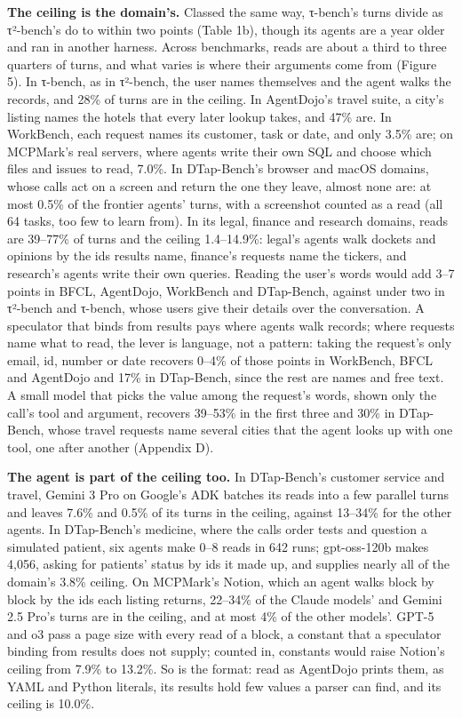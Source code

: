 \documentclass[10pt,twocolumn,letterpaper]{article}
\newcommand{\runin}[1]{{\sffamily\bfseries\color{accent}#1}}
\begin{document}
\runin{The ceiling is the domain's.} Classed the same way, τ-bench's turns divide as τ²-bench's do to within two points (Table 1b), though its agents are a year older and ran in another harness. Across benchmarks, reads are about a third to three quarters of turns, and what varies is where their arguments come from (Figure 5). In τ-bench, as in τ²-bench, the user names themselves and the agent walks the records, and 28\% of turns are in the ceiling. In AgentDojo's travel suite, a city's listing names the hotels that every later lookup takes, and 47\% are. In WorkBench, each request names its customer, task or date, and only 3.5\% are; on MCPMark's real servers, where agents write their own SQL and choose which files and issues to read, 7.0\%. In DTap-Bench's browser and macOS domains, whose calls act on a screen and return the one they leave, almost none are: at most 0.5\% of the frontier agents' turns, with a screenshot counted as a read (all 64 tasks, too few to learn from). In its legal, finance and research domains, reads are 39--77\% of turns and the ceiling 1.4--14.9\%: legal's agents walk dockets and opinions by the ids results name, finance's requests name the tickers, and research's agents write their own queries. Reading the user's words would add 3--7 points in BFCL, AgentDojo, WorkBench and DTap-Bench, against under two in τ²-bench and τ-bench, whose users give their details over the conversation. A speculator that binds from results pays where agents walk records; where requests name what to read, the lever is language, not a pattern: taking the request's only email, id, number or date recovers 0--4\% of those points in WorkBench, BFCL and AgentDojo and 17\% in DTap-Bench, since the rest are names and free text. A small model that picks the value among the request's words, shown only the call's tool and argument, recovers 39--53\% in the first three and 30\% in DTap-Bench, whose travel requests name several cities that the agent looks up with one tool, one after another (Appendix D).

\runin{The agent is part of the ceiling too.} In DTap-Bench's customer service and travel, Gemini 3 Pro on Google's ADK batches its reads into a few parallel turns and leaves 7.6\% and 0.5\% of its turns in the ceiling, against 13--34\% for the other agents. In DTap-Bench's medicine, where the calls order tests and question a simulated patient, six agents make 0--8 reads in 642 runs; gpt-oss-120b makes 4,056, asking for patients' status by ids it made up, and supplies nearly all of the domain's 3.8\% ceiling. On MCPMark's Notion, which an agent walks block by block by the ids each listing returns, 22--34\% of the Claude models' and Gemini 2.5 Pro's turns are in the ceiling, and at most 4\% of the other models'. GPT-5 and o3 pass a page size with every read of a block, a constant that a speculator binding from results does not supply; counted in, constants would raise Notion's ceiling from 7.9\% to 13.2\%. So is the format: read as AgentDojo prints them, as YAML and Python literals, its results hold few values a parser can find, and its ceiling is 10.0\%.
\end{document}
